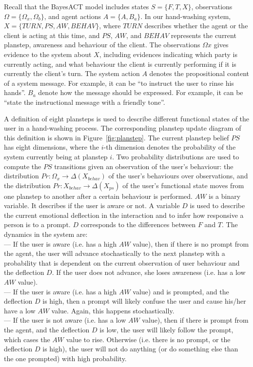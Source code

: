 Recall that the BayesACT model includes states $S = \{F, T, X\}$, observations $\Omega = \{\Omega_{x}, \Omega_{b}\}$, and agent actions $A = \{A, B_{a}\}$. In our hand-washing system, $X = \{TURN, PS, AW, BEHAV\}$, where $TURN$ describes whether the agent or the client is acting at this time, and $PS$, $AW$, and $BEHAV$ represents the current planstep, awareness and behaviour of the client. The observations $\Omega{x}$ gives evidence to the system about $X$, including evidences indicating which party is currently acting, and what behaviour the client is currently performing if it is currently the client's turn. The system action $A$ denotes the propositional content of a system message. For example, it can be ``to instruct the user to rinse his hands''. $B_{a}$ denote how the message should be expressed. For example, it can be ``state the instructional message with a friendly tone''.

A definition of eight plansteps is used to describe different functional states of the user in a hand-washing process. The corresponding planstep update diagram of this definition is shown in Figure~\ref{fig:planstep}. The current planstep belief $PS$ has eight dimensions, where the $i$-th dimension denotes the probability of the system currently being at planstep $i$. Two probability distributions are used to compute the $PS$ transitions given an observation of the user's behaviour: the distribution $Pr: \Omega_{x} \to \Delta(X_{behav})$ of the user's behaviours over observations, and the distribution $Pr: X_{behav} \to \Delta(X_{ps})$ of the user's functional state moves from one planstep to another after a certain behaviour is performed. $AW$ is a binary variable. It describes if the user is aware or not. A variable $D$ is used to describe the current emotional deflection in the interaction and to infer how responsive a person is to a prompt. $D$ corresponds to the differences between $F$ and $T$. The dynamics in the system are: \\
--- If the user is aware (i.e. has a high $AW$ value), then if there is no prompt from the agent, the user will advance stochastically to the next planstep with a probability that is dependent on the current observation of user behaviour and the deflection $D$. If the user does not advance, she loses awareness (i.e. has a low $AW$ value). \\
--- If the user is aware (i.e. has a high $AW$ value) and is prompted, and the deflection $D$ is high, then a prompt will likely confuse the user and cause his/her have a low $AW$ value. Again, this happens stochastically. \\
--- If the user is not aware (i.e. has a low $AW$ value), then if there is prompt from the agent, and the deflection $D$ is low, the user will likely follow the prompt, which cases the $AW$ value to rise. Otherwise (i.e. there is no prompt, or the deflection $D$ is high), the user will not do anything (or do something else than the one prompted) with high probability.


